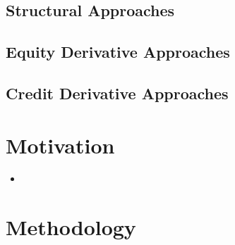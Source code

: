 \subsection{Structural Approaches}

\subsection{Equity Derivative Approaches}

\subsection{Credit Derivative Approaches}

\section{Motivation}

\begin{itemize}
\item 
\end{itemize}


\section{Methodology}

